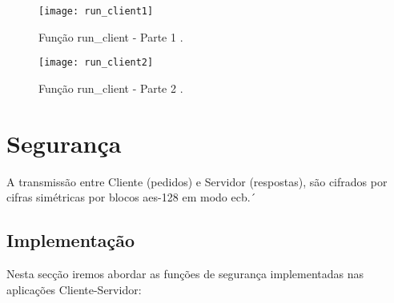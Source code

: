 \begin{figure}[H]
	\centering
	\texttt{[image: run\_client1]}
	\caption{Função run\_client - Parte 1 .\\}
	\label{fig:run_client1}
\end{figure} 

\begin{figure}[H]
	\centering
	\texttt{[image: run\_client2]}
	\caption{Função run\_client - Parte 2 .\\}
	\label{fig:run_client2}
\end{figure} 

\section{Segurança}
\label{sec.segurança}
A transmissão entre Cliente (pedidos) e Servidor (respostas), são cifrados por cifras simétricas por blocos \ac{aes-128} em modo \ac{ecb}.´

\subsection*{Implementação}
\label{sub.seg_implementação}
Nesta secção iremos abordar as funções de segurança implementadas nas aplicações Cliente-Servidor:

